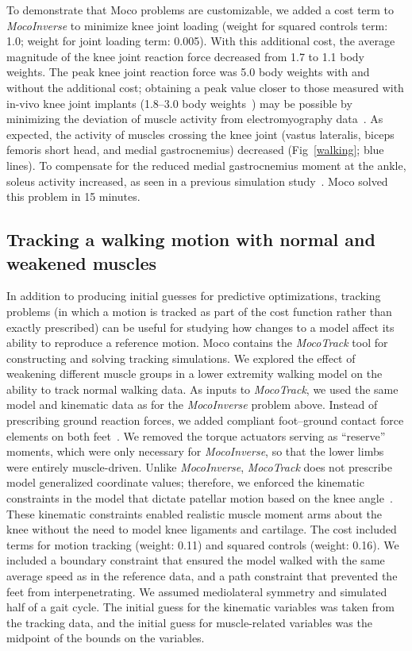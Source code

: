 \documentclass[10pt,letterpaper]{article}
\begin{document}
To demonstrate that Moco problems are customizable, we added a cost term to \textit{MocoInverse} to minimize knee joint loading (weight for squared controls term: 1.0; weight for joint loading term: 0.005). With this additional cost, the average magnitude of the knee joint reaction force decreased from 1.7 to 1.1 body weights. The peak knee joint reaction force was 5.0 body weights with and without the additional cost; obtaining a peak value closer to those measured with in-vivo knee joint implants (1.8--3.0 body weights~\cite{Fregly:2011ke}) may be possible by minimizing the deviation of muscle activity from electromyography data~\cite{Kinney:2013}. As expected, the activity of muscles crossing the knee joint (vastus lateralis, biceps femoris short head, and medial gastrocnemius) decreased (Fig~\ref{walking}; blue lines). To compensate for the reduced medial gastrocnemius moment at the ankle, soleus activity increased, as seen in a previous simulation study~\cite{DeMers:2014}. Moco solved this problem in 15 minutes.

\subsection*{Tracking a walking motion with normal and weakened muscles}

In addition to producing initial guesses for predictive optimizations, tracking problems (in which a motion is tracked as part of the cost function rather than exactly prescribed) can be useful for studying how changes to a model affect its ability to reproduce a reference motion. Moco contains the \textit{MocoTrack} tool for constructing and solving tracking simulations. We explored the effect of weakening different muscle groups in a lower extremity walking model on the ability to track normal walking data. As inputs to \textit{MocoTrack}, we used the same model and kinematic data as for the \textit{MocoInverse} problem above. Instead of prescribing ground reaction forces, we added compliant foot--ground contact force elements on both feet~\cite{Falisse:2019b}. We removed the torque actuators serving as ``reserve'' moments, which were only necessary for \textit{MocoInverse}, so that the lower limbs were entirely muscle-driven. Unlike \textit{MocoInverse}, \textit{MocoTrack} does not prescribe model generalized coordinate values; therefore, we enforced the kinematic constraints in the model that dictate patellar motion based on the knee angle~\cite{Arnold:2010}. These kinematic constraints enabled realistic muscle moment arms about the knee without the need to model knee ligaments and cartilage. The cost included terms for motion tracking (weight: 0.11) and squared controls (weight: 0.16). We included a boundary constraint that ensured the model walked with the same average speed as in the reference data, and a path constraint that prevented the feet from interpenetrating. We assumed mediolateral symmetry and simulated half of a gait cycle. The initial guess for the kinematic variables was taken from the tracking data, and the initial guess for muscle-related variables was the midpoint of the bounds on the variables.
\end{document}
